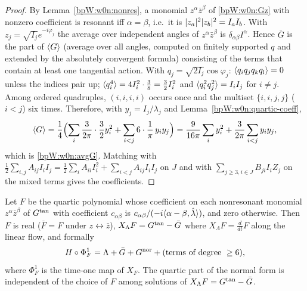 \begin{proof}
\label{stepW:w0n:resavg}
By Lemma~\ref{bpW:w0n:nonres}, a monomial $z^\alpha\bar z^\beta$ of \eqref{bpW:w0n:Gz} with nonzero coefficient is
resonant iff $\alpha=\beta$, i.e.\ it is $\lvert z_a\rvert^2\lvert z_b\rvert^2=I_aI_b$. With $z_j=\sqrt{I_j}e^{-i\varphi_j}$ the
average over independent angles of $z^\alpha\bar z^\beta$ is $\delta_{\alpha\beta}I^\alpha$. Hence $\bar G$ is the
part of $\langle G\rangle$ (average over all angles, computed on finitely supported $q$ and extended by the absolutely
convergent formula) consisting of the terms that contain at least one tangential action.
\label{stepW:w0n:moments}
With $q_j=\sqrt{2I_j}\cos\varphi_j$: $\langle q_iq_jq_kq_l\rangle=0$ unless the indices pair up; $\langle q_i^4\rangle=4I_i^2\cdot\frac38
=\frac32I_i^2$ and $\langle q_i^2q_j^2\rangle=I_iI_j$ for $i\neq j$. Among ordered quadruples, $(i,i,i,i)$ occurs once and the
multiset $\{i,i,j,j\}$ ($i<j$) six times.
\label{stepW:w0n:sum}
Therefore, with $y_j=I_j/\lambda_j$ and Lemma~\ref{bpW:w0n:quartic-coeff},
\[\langle G\rangle=\frac14\Bigl(\sum_i\frac{3}{2\pi}\cdot\frac32y_i^2+\sum_{i<j}6\cdot\frac1\pi\,y_iy_j\Bigr)
=\frac{9}{16\pi}\sum_iy_i^2+\frac{3}{2\pi}\sum_{i<j}y_iy_j,\]
which is \eqref{bpW:w0n:avgG}. Matching with $\frac12\sum_{i,j}A_{ij}I_iI_j=\frac12\sum_iA_{ii}I_i^2+\sum_{i<j}A_{ij}I_iI_j$
on $J$ and with $\sum_{j\ge3,i\in J}B_{ji}I_iZ_j$ on the mixed terms gives the coefficients.
\end{proof}

\begin{proposition}\label{bpW:w0n:formal-birkhoff}
Let $F$ be the quartic polynomial whose coefficient on each nonresonant monomial $z^\alpha\bar z^\beta$ of
$G^{\rm tan}$ with coefficient $c_{\alpha\beta}$ is $c_{\alpha\beta}/(-i\langle \alpha-\beta,\hat\lambda\rangle)$, and zero
otherwise. Then $F$ is real ($\overline{F}=F$ under $z\leftrightarrow\bar z$), $X_\Lambda F=G^{\rm tan}-\bar G$ where
$X_\Lambda F=\frac{d}{dt}F$ along the linear flow, and formally
\[H\circ\Phi^1_F=\Lambda+\bar G+G^{\rm nor}+(\text{terms of degree}\ \ge6),\]
where $\Phi^1_F$ is the time-one map of $X_F$. The quartic part of the normal form is independent of the choice of
$F$ among solutions of $X_\Lambda F=G^{\rm tan}-\bar G$.
\end{proposition}

